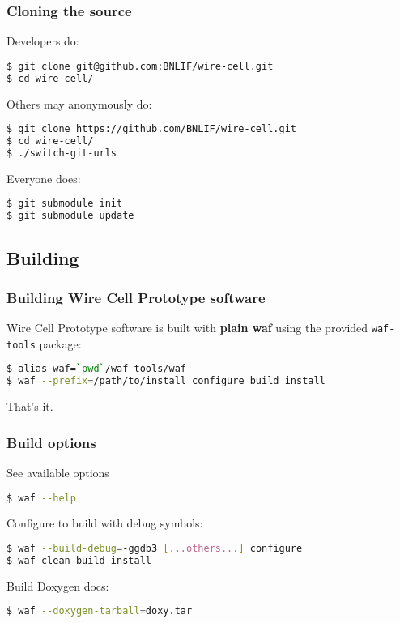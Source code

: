 \documentclass[xcolor=dvipsnames]{beamer}
\begin{document}
\begin{frame}[fragile]
  \frametitle{Cloning the source}
  Developers do:
\begin{lstlisting}[language=sh]
$ git clone git@github.com:BNLIF/wire-cell.git
$ cd wire-cell/
\end{lstlisting}

  Others may anonymously do:
\begin{lstlisting}[language=sh]
$ git clone https://github.com/BNLIF/wire-cell.git
$ cd wire-cell/
$ ./switch-git-urls
\end{lstlisting}

  Everyone does:

\begin{lstlisting}[language=sh]
$ git submodule init
$ git submodule update
\end{lstlisting}

\end{frame}

\subsection{Building}

\begin{frame}[fragile]
  \frametitle{Building Wire Cell Prototype software}
  
  Wire Cell Prototype software is built with \textbf{plain waf} using the
  provided \texttt{waf-tools} package:

\begin{lstlisting}[language=sh]
$ alias waf=`pwd`/waf-tools/waf
$ waf --prefix=/path/to/install configure build install
\end{lstlisting}


\vspace{5mm}
That's it.

\end{frame}

\begin{frame}
  \frametitle{Build options}
  See available options
\begin{lstlisting}[language=sh]
$ waf --help
\end{lstlisting}

  Configure to build with debug symbols:
\begin{lstlisting}[language=sh]
$ waf --build-debug=-ggdb3 [...others...] configure
$ waf clean build install
\end{lstlisting}

  Build Doxygen docs:
\begin{lstlisting}[language=sh]
$ waf --doxygen-tarball=doxy.tar
\end{lstlisting}

\end{frame}
\end{document}
